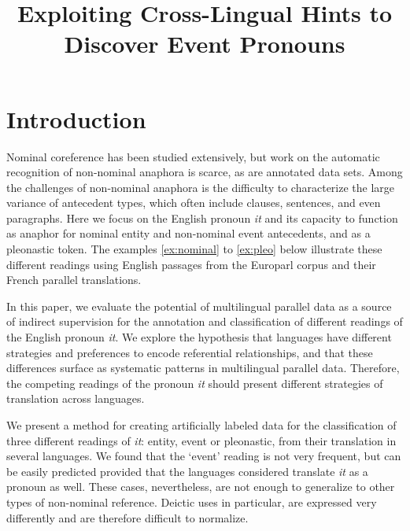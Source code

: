 \documentclass[10pt, a4paper]{article}
\title{Exploiting Cross-Lingual Hints to Discover Event Pronouns}
\begin{document}
\maketitleabstract

\section{Introduction}

\renewcommand{\thefootnote}{\fnsymbol{footnote}}


Nominal coreference has been studied extensively, but work on the automatic 
recognition of non-nominal anaphora is scarce, as are annotated data sets. Among 
the challenges of non-nominal anaphora is the difficulty to characterize the 
large variance of antecedent types, which often include clauses, sentences, and 
even paragraphs. Here we focus on the English pronoun \textit{it} and its 
capacity to function as anaphor for nominal entity and non-nominal event 
antecedents, and as a pleonastic token. The examples \ref{ex:nominal} to 
\ref{ex:pleo} below illustrate these different readings using English passages 
from the Europarl corpus and their French parallel translations.


In this paper, we evaluate the potential of multilingual parallel data as a 
source of indirect supervision for the annotation and classification of 
different readings of the English 
pronoun \textit{it}. We explore the hypothesis that languages have different 
strategies and preferences to encode referential relationships, and that these 
differences surface as systematic patterns in multilingual parallel data. 
Therefore, the competing readings of the pronoun \textit{it} should present 
different strategies of translation across languages.  

We present a method for creating artificially labeled data for the 
classification of three different readings of \textit{it}: entity, event or 
pleonastic, from their translation in several languages. We found that the 
`event' reading is not very frequent, but can be easily predicted provided that 
the languages considered translate \textit{it} as a pronoun as well. These 
cases, nevertheless, are not enough to generalize to other types of non-nominal 
reference. Deictic uses in particular, are expressed very differently and are 
therefore difficult to normalize.
\end{document}
